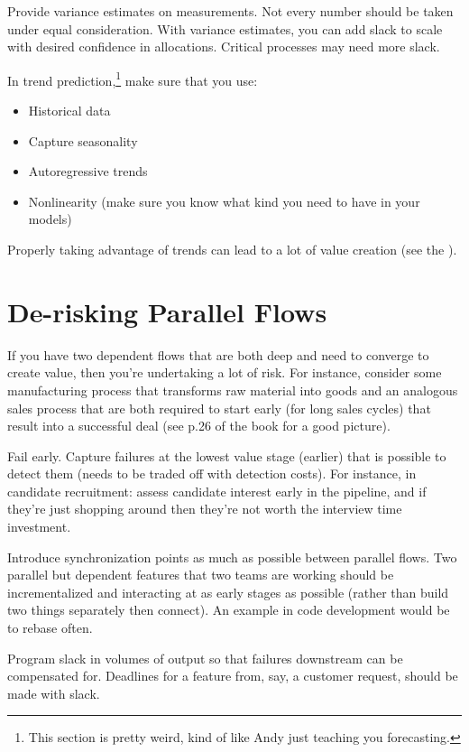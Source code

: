 \documentclass{article}
\begin{document}
Provide variance estimates on measurements. Not every number should be taken under equal consideration. With variance estimates, you can add slack to scale with desired confidence in allocations. Critical processes may need more slack.

In trend prediction,\footnote{This section is pretty weird, kind of like Andy just teaching you forecasting.} make sure that you use:
\begin{itemize}
\item Historical data
\item Capture seasonality
\item Autoregressive trends
\item Nonlinearity (make sure you know what kind you need to have in your models)
\end{itemize}

Properly taking advantage of trends can lead to a lot of value creation (see the ).

\section{De-risking Parallel Flows}

If you have two dependent flows that are both deep and need to converge to create value, then you're undertaking a lot of risk. For instance, consider some manufacturing process that transforms raw material into goods and an analogous sales process that are both required to start early (for long sales cycles) that result into a successful deal (see p.26 of the book for a good picture).

Fail early. Capture failures at the lowest value stage (earlier) that is possible to detect them (needs to be traded off with detection costs). For instance, in candidate recruitment: assess candidate interest early in the pipeline, and if they’re just shopping around then they’re not worth the interview time investment.

Introduce synchronization points as much as possible between parallel flows. Two parallel but dependent features that two teams are working should be incrementalized and interacting at as early stages as possible (rather than build two things separately then connect). An example in code development would be to rebase often.

Program slack in volumes of output so that failures downstream can be compensated for. Deadlines for a feature from, say, a customer request, should be made with slack.
\end{document}
